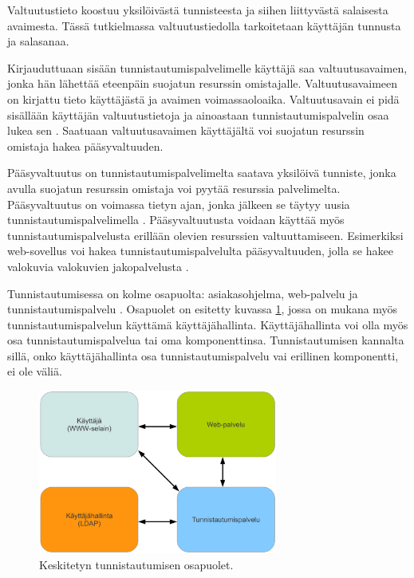 Valtuutustieto koostuu yksilöivästä tunnisteesta ja siihen liittyvästä salaisesta avaimesta. Tässä tutkielmassa valtuutustiedolla tarkoitetaan käyttäjän tunnusta ja salasanaa.

Kirjauduttuaan sisään tunnistautumispalvelimelle käyttäjä saa valtuutusavaimen, jonka hän lähettää eteenpäin suojatun resurssin omistajalle. Valtuutusavaimeen on kirjattu tieto käyttäjästä ja avaimen voimassaoloaika. Valtuutusavain ei pidä sisällään käyttäjän valtuutustietoja ja ainoastaan tunnistautumispalvelin osaa lukea sen \cite{nisti}. Saatuaan valtuutusavaimen käyttäjältä voi suojatun resurssin omistaja hakea pääsyvaltuuden.

Pääsyvaltuutus on tunnistautumispalvelimelta saatava yksilöivä tunniste, jonka avulla suojatun resurssin omistaja voi pyytää resurssia palvelimelta. Pääsyvaltuutus on voimassa tietyn ajan, jonka jälkeen se täytyy uusia tunnistautumispalvelimella \cite{nisti}. Pääsyvaltuutusta voidaan käyttää myös tunnistautumispalvelusta erillään olevien resurssien valtuuttamiseen. Esimerkiksi web-sovellus voi hakea tunnistautumispalvelulta pääsyvaltuuden, jolla se hakee valokuvia valokuvien jakopalvelusta \cite{facebook}.

Tunnistautumisessa on kolme osapuolta: asiakasohjelma, web-palvelu ja tunnistautumispalvelu \cite{nisti}. Osapuolet on esitetty kuvassa \ref{composition}, jossa on mukana myös tunnistautumispalvelun käyttämä käyttäjähallinta. Käyttäjähallinta voi olla myös osa tunnistautumispalvelua tai oma komponenttinsa. Tunnistautumisen kannalta sillä, onko käyttäjähallinta osa tunnistautumispalvelu vai erillinen komponentti, ei ole väliä.

\begin{figure}[ht]
\centering
\includegraphics[width=0.7\textwidth]{teknologiat/composition.eps}
\caption{Keskitetyn tunnistautumisen osapuolet.}%
\label{composition}
\end{figure}

